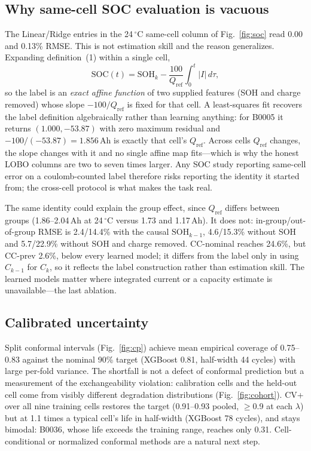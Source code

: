 \documentclass[conference,a4paper]{IEEEtran}
\begin{document}
\subsection{Why same-cell SOC evaluation is vacuous}
The Linear/Ridge entries in the 24\,$^\circ$C same-cell column of
Fig.~\ref{fig:soc} read 0.00 and 0.13\% RMSE. This is not estimation skill
and the reason generalizes. Expanding definition~(1) within a single cell,
\begin{equation}
\mathrm{SOC}(t) = \mathrm{SOH}_k - \frac{100}{Q_{\mathrm{ref}}}\int_0^t |I|\,d\tau ,
\end{equation}
so the label is an \emph{exact affine function} of two supplied features
(SOH and charge removed) whose slope $-100/Q_{\mathrm{ref}}$ is fixed for
that cell. A least-squares fit recovers the label definition algebraically
rather than learning anything: for B0005 it returns $(1.000, -53.87)$ with
zero maximum residual and $-100/(-53.87) = 1.856$\,Ah is exactly that cell's
$Q_{\mathrm{ref}}$. Across cells $Q_{\mathrm{ref}}$ changes, the slope
changes with it and no single affine map fits---which is why the honest LOBO
columns are two to seven times larger. Any SOC study reporting same-cell
error on a coulomb-counted label therefore risks reporting the identity it
started from; the cross-cell protocol is what makes the task real.

The same identity could explain the group effect, since $Q_{\mathrm{ref}}$
differs between groups (1.86--2.04\,Ah at 24\,$^\circ$C versus 1.73 and
1.17\,Ah). It does not: in-group/out-of-group RMSE is 2.4/14.4\% with the
causal $\mathrm{SOH}_{k-1}$, 4.6/15.3\% without SOH and 5.7/22.9\% without SOH
and charge removed. CC-nominal reaches 24.6\%, but CC-prev 2.6\%, below every
learned model; it differs from the label only in using $C_{k-1}$ for $C_k$,
so it reflects the label construction rather than estimation skill. The
learned models matter where integrated current or a capacity estimate is
unavailable---the last ablation.

\subsection{Calibrated uncertainty}
Split conformal intervals (Fig.~\ref{fig:cp}) achieve mean empirical coverage
of 0.75--0.83 against the nominal 90\% target (XGBoost 0.81, half-width 44
cycles) with large per-fold variance. The shortfall is not a defect of
conformal prediction but a measurement of the exchangeability violation:
calibration cells and the held-out cell come from visibly different
degradation distributions (Fig.~\ref{fig:cohort}). CV+ over all nine training cells
restores the target (0.91--0.93 pooled, $\geq$0.9 at each $\lambda$) but at
1.1 times a typical cell's life in half-width (XGBoost 78 cycles), and stays
bimodal: B0036, whose life exceeds the training range, reaches only 0.31.
Cell-conditional or normalized conformal methods are a natural next step.
\end{document}
